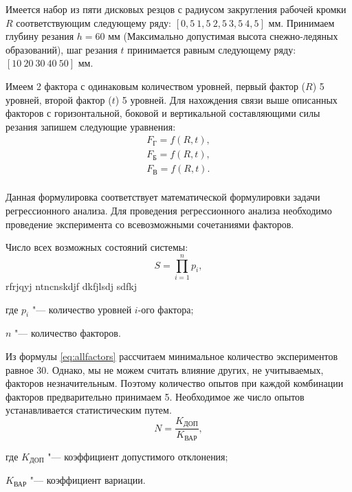 Имеется набор из пяти дисковых резцов с радиусом закругления рабочей кромки $R$ соответствующим следующему ряду: $[0,5\ 1,5\ 2,5\ 3,5\ 4,5]$ мм. Принимаем глубину резания $h=60$ мм (Максимально допустимая высота снежно-ледяных образований), шаг резания $t$ принимается равным следующему ряду: $[10\ 20\ 30\ 40\ 50]$ мм.

Имеем 2 фактора с одинаковым количеством уровней, первый фактор ($R$) 5 уровней, второй фактор ($t$) 5 уровней. Для нахождения связи выше описанных факторов с горизонтальной, боковой и вертикальной составляющими силы резания запишем следующие уравнения:
\begin{equation}
\label{eq:regresF}
\begin{alignedat}{2}
	F_\text{Г}=f(R,t),\\
	F_\text{Б}=f(R,t),\\
	F_\text{В}=f(R,t).\\
\end{alignedat}
\end{equation}

Данная формулировка соответствует математической формулировки задачи регрессионного анализа. Для проведения регрессионного анализа необходимо проведение эксперимента со всевозможными сочетаниями факторов.

Число всех возможных состояний системы:
\begin{equation}
\label{eq:allfactors}
S=\prod_{i=1}^n p_i,
\end{equation}
rfrjqyj ntncnskdjf dkfjlsdj sdfkj
\begin{myitemize}
	\item[где ] $ p_i $ "--- количество уровней $i$-ого фактора;
	\item$ n $ "--- количество факторов.
\end{myitemize}
\hrulefill
Из формулы \ref{eq:allfactors} рассчитаем минимальное количество экспериментов равное 30. Однако, мы не можем считать влияние других, не учитываемых, факторов незначительным. Поэтому количество опытов при каждой комбинации факторов предварительно принимаем 5. Необходимое же число опытов устанавливается статистическим путем.
\begin{equation}
\label{eq:nexpr}
N=\frac{K_{\text{ДОП}}}{K_{\text{ВАР}}},
\end{equation}
\begin{myitemize}
	\item[где ] $ K_{\text{ДОП}} $ "--- коэффициент допустимого отклонения;
	\item $ K_{\text{ВАР}} $ "--- коэффициент вариации.
\end{myitemize}

